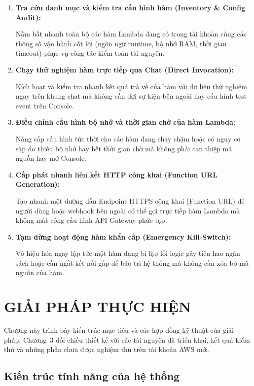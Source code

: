 \documentclass[a4paper,12pt]{article}
\begin{document}
\begin{enumerate}
  \item \textbf{Tra cứu danh mục và kiểm tra cấu hình hàm (Inventory \& Config Audit):}

Nắm bắt nhanh toàn bộ các hàm Lambda đang có trong tài khoản cùng các thông số vận hành cốt lõi (ngôn ngữ runtime, bộ nhớ RAM, thời gian timeout) phục vụ công tác kiểm toán tài nguyên.


  \item \textbf{Chạy thử nghiệm hàm trực tiếp qua Chat (Direct Invocation):}

Kích hoạt và kiểm tra nhanh kết quả trả về của hàm với dữ liệu thử nghiệm ngay trên khung chat mà không cần đợi sự kiện bên ngoài hay cấu hình test event trên Console.


  \item \textbf{Điều chỉnh cấu hình bộ nhớ và thời gian chờ của hàm Lambda:}

Nâng cấp cấu hình tức thời cho các hàm đang chạy chậm hoặc có nguy cơ sập do thiếu bộ nhớ hay hết thời gian chờ mà không phải can thiệp mã nguồn hay mở Console.


  \item \textbf{Cấp phát nhanh liên kết HTTP công khai (Function URL Generation):}

Tạo nhanh một đường dẫn Endpoint HTTPS công khai (Function URL) để người dùng hoặc webhook bên ngoài có thể gọi trực tiếp hàm Lambda mà không mất công cấu hình API Gateway phức tạp.


  \item \textbf{Tạm dừng hoạt động hàm khẩn cấp (Emergency Kill-Switch):}

Vô hiệu hóa ngay lập tức một hàm đang bị lặp lỗi logic gây tiêu hao ngân sách hoặc cần ngắt kết nối gấp để bảo trì hệ thống mà không cần xóa bỏ mã nguồn của hàm.

\end{enumerate}
\endgroup

\clearpage

\section{GIẢI PHÁP THỰC HIỆN}

Chương này trình bày kiến trúc mục tiêu và các hợp đồng kỹ thuật của giải pháp.
Chương~3 đối chiếu thiết kế với các tài nguyên đã triển khai, kết quả kiểm thử
và những phần chưa được nghiệm thu trên tài khoản AWS mới.


\subsection{Kiến trúc tính năng của hệ thống}
\end{document}
